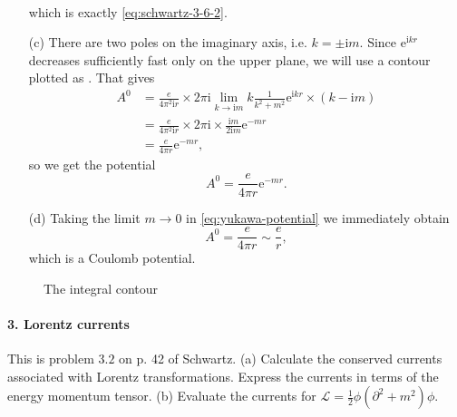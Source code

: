 \documentclass[hyperref, a4paper]{article}
\newcommand*{\ii}{\mathrm{i}}
\newcommand*{\ee}{\mathrm{e}}
\begin{document}
\begin{itemize}
\[\begin{aligned}
        \end{aligned}
    \]
    which is exactly \eqref{eq:schwartz-3-6-2}.
    \item[(c)] There are two poles on the imaginary axis, i.e. $k = \pm \ii m$. 
    Since $\ee^{\ii k r}$ decreases sufficiently fast only on the upper plane, we will use a contour plotted as . That gives 
    \[
        \begin{aligned}
            A^0 &= \frac{e}{4\pi^2 \ii r} \times 2 \pi \ii \lim_{k \to \ii m} k \frac{1}{k^2 + m^2} \ee^{\ii k r} \times (k - \ii m) \\
            &= \frac{e}{4\pi^2 \ii r} \times 2\pi \ii \times \frac{\ii m}{2 \ii m} \ee^{- m r} \\
            &= \frac{e}{4 \pi r} \ee^{- m r},
        \end{aligned}
    \] 
    so we get the potential 
    \begin{equation}
        A^0 = \frac{e}{4 \pi r} \ee^{- m r}.
        \label{eq:yukawa-potential}
    \end{equation}
    \item[(d)] Taking the limit $m \to 0$ in \eqref{eq:yukawa-potential} we immediately obtain
    \begin{equation}
        A^0 = \frac{e}{4 \pi r} \sim \frac{e}{r},
    \end{equation} 
    which is a Coulomb potential.
\end{itemize}

\begin{figure}
    \centering
    
    \caption{The integral contour}
    \label{fig:integral-cont-1}
\end{figure}

\paragraph{3. Lorentz currents} This is problem $3.2$ on p. 42 of Schwartz.
(a) Calculate the conserved currents associated with Lorentz transformations. Express the currents in terms of the energy momentum tensor.
(b) Evaluate the currents for $\mathcal{L}=\frac{1}{2} \phi\left(\partial^{2}+m^{2}\right) \phi$.
\end{document}
